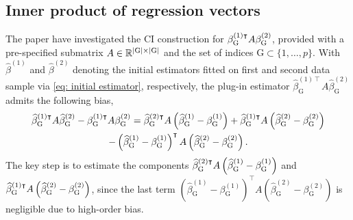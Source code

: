 
\subsection{Inner product of regression vectors}
\label{subsec: inner product}
The paper \citet{guo2019optimal, ma2022statistical} have investigated the CI construction for $\beta^{(1)\intercal}_{\mathrm{G}} A \beta^{(2)}_{\mathrm{G}}$, provided with a pre-specified submatrix $A \in \mathbb{R}^{|\mathrm{G}|\times |\mathrm{G}|}$ and the set of indices $\mathrm{G} \subset \{1,\ldots, p\}$. With $\widehat{\beta}^{(1)}$ and $\widehat{\beta}^{(2)}$ denoting the initial estimators fitted on first and second data sample via \eqref{eq: initial estimator}, respectively, the plug-in estimator $\widehat{\beta}^{(1)\intercal}_\mathrm{G} A \widehat{\beta}^{(2)}_\mathrm{G}$ admits the following bias, 
\begin{multline*}
    \widehat{\beta}^{(1)\intercal}_\mathrm{G} A \widehat{\beta}^{(2)}_\mathrm{G} - \beta_\mathrm{G}^{(1)\intercal} A \beta_\mathrm{G}^{(2)} = \widehat{\beta}_{\mathrm{G}}^{(2)\intercal} A \left(\widehat{\beta}_{\mathrm{G}}^{(1)} - \beta_{\mathrm{G}}^{(1)}\right) + \widehat{\beta}_{\mathrm{G}}^{(1)\intercal} A \left(\widehat{\beta}_{\mathrm{G}}^{(2)} - \beta_{\mathrm{G}}^{(2)}\right)  \\
    - \left(\widehat{\beta}_{\mathrm{G}}^{(1)} - \beta_{\mathrm{G}}^{(1)}\right)^\intercal A \left(\widehat{\beta}_{\mathrm{G}}^{(2)} - \beta_{\mathrm{G}}^{(2)}\right).
\end{multline*}
The key step is to estimate the components $ \widehat{\beta}_{\mathrm{G}}^{(2)\intercal} A \left(\widehat{\beta}_{\mathrm{G}}^{(1)} - \beta_{\mathrm{G}}^{(1)}\right) $ and $\widehat{\beta}_{\mathrm{G}}^{(1)\intercal} A \left(\widehat{\beta}_{\mathrm{G}}^{(2)} -  \beta_{\mathrm{G}}^{(2)}\right)$, since the last term $(\widehat{\beta}^{(1)}_{\textrm{G}} - \beta_{\textrm{G}}^{(1)})^\intercal A (\widehat{\beta}_{\textrm{G}}^{(2)} - \beta_{\textrm{G}}^{(2)})$ is negligible due to high-order bias.
